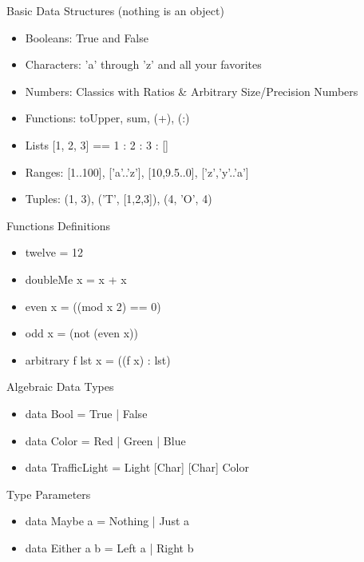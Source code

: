 \documentclass{beamer}                  %
\newcommand{\srule}{
	\rule{\textwidth}{1pt}\\
}
\newlength{\subsecwidth}
\newenvironment{slide}{
	\begin{frame} %
	\settowidth{\subsecwidth}{\insertsubsection} %
	\ifthenelse{\dimtest{\subsecwidth}{<}{1pt}}{ %
		\frametitle{\insertsection\\             %
		\vspace{-1ex}                            %
		\color{fore}\srule                       %
		\par                                     %
		\vspace{-3ex}                            %
		}
	}{                                           %
		\frametitle{\insertsection\ -- \insertsubsection\\ %
		\vspace{-1ex}                            %
		\color{fore}\srule                       %
		\par                                     %
		\vspace{-3ex}                            %
		}
	}
	\Large                                       %
}{
	\end{frame}
}
\begin{document}
\begin{slide}
  Basic Data Structures (nothing is an object)
  \begin{itemize}
    \item Booleans: True and False
    \item Characters: 'a' through 'z' and all your favorites
    \item Numbers: Classics with Ratios \& Arbitrary Size/Precision Numbers
    \item Functions: toUpper, sum, (+), (:)
    \item{}{} Lists [1, 2, 3] == 1 : 2 : 3 : []
    \item{}{} Ranges: [1..100], ['a'..'z'], [10,9.5..0], ['z','y'..'a']
    \item Tuples: (1, 3), ('T', [1,2,3]), (4, 'O', 4)
  \end{itemize}
\end{slide}

\begin{slide}
  Functions Definitions
  \begin{itemize}
    \item twelve = 12
    \item doubleMe x = x + x
    \item even x = ((mod x 2) == 0)
    \item odd x = (not (even x))
    \item arbitrary f lst x = ((f x) : lst)
  \end{itemize}
\end{slide}

\begin{slide}
  Algebraic Data Types
  \begin{itemize}
    \item data Bool = True | False
    \item data Color = Red | Green | Blue
    \item data TrafficLight = Light [Char] [Char] Color
  \end{itemize}
\end{slide}

\begin{slide}
  Type Parameters
  \begin{itemize}
    \item data Maybe a = Nothing | Just a
    \item data Either a b = Left a | Right b
  \end{itemize}
\end{slide}
\end{document}
